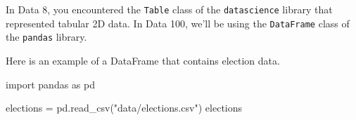 \documentclass[
  letterpaper,
  DIV=11,
  numbers=noendperiod]{scrreprt}
\newenvironment{Shaded}{\begin{snugshade}}{\end{snugshade}}
\newcommand{\ImportTok}[1]{\textcolor[rgb]{0.00,0.46,0.62}{#1}}
\newcommand{\NormalTok}[1]{\textcolor[rgb]{0.00,0.23,0.31}{#1}}
\newcommand{\OperatorTok}[1]{\textcolor[rgb]{0.37,0.37,0.37}{#1}}
\newcommand{\StringTok}[1]{\textcolor[rgb]{0.13,0.47,0.30}{#1}}
\begin{document}
In Data 8, you encountered the \texttt{Table} class of the
\texttt{datascience} library that represented tabular 2D data. In Data
100, we'll be using the \texttt{DataFrame} class of the \texttt{pandas}
library.

Here is an example of a DataFrame that contains election data.

\begin{Shaded}
\begin{Highlighting}[]
\ImportTok{import}\NormalTok{ pandas }\ImportTok{as}\NormalTok{ pd}

\NormalTok{elections }\OperatorTok{=}\NormalTok{ pd.read\_csv(}\StringTok{"data/elections.csv"}\NormalTok{)}
\NormalTok{elections}
\end{Highlighting}
\end{Shaded}
\end{document}
